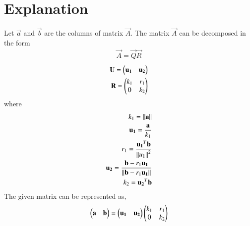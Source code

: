 \documentclass[journal,12pt,twocolumn]{IEEEtran}
\begin{document}
\section{Explanation}
Let $\vec{a}$ and $\vec{b}$ are the columns of matrix $\vec{A}$. The matrix $\vec{A}$ can be decomposed in the form
\begin{align}
    \vec{A}=\vec{Q}\vec{R}
\end{align}
\begin{align}
    \mathbf{U}=\begin{pmatrix}\mathbf{u_1}&\mathbf{u_2}\end{pmatrix}\\
    \mathbf{R}=\begin{pmatrix}k_1&r_1\\0&k_2\end{pmatrix}
\end{align}
where
\begin{align}
    k_1=\left\lVert\mathbf{a}\right\rVert\label{k1}\\
    \mathbf{u_1}=\frac{\mathbf{a}}{k_1}\label{u1}\\
    r_1=\frac{\mathbf{u_1}^T\mathbf{b}}{\left\lVert u_1\right\rVert^2}\label{r1}\\
    \mathbf{u_2}=\frac{\mathbf{b}-r_1\mathbf{u_1}}{\left\lVert\mathbf{b}-r_1\mathbf{u_1}\right\rVert}\label{u2}\\
    k_2=\mathbf{u_2}^T\mathbf{b}\label{k2}
\end{align}
The given matrix can be represented as,
\begin{align}\label{rep}
    \begin{pmatrix}\mathbf{a}&\mathbf{b}\end{pmatrix}=\begin{pmatrix}\mathbf{u_1}&\mathbf{u_2}\end{pmatrix}\begin{pmatrix}k_1&r_1\\0&k_2\end{pmatrix}
\end{align}
\end{document}
